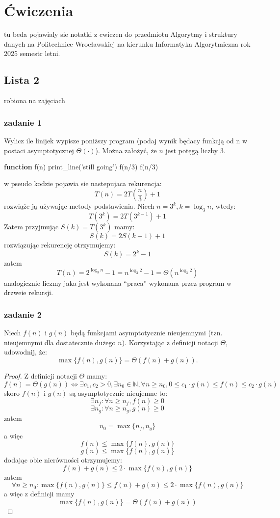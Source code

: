 \documentclass[11pt,a4paper]{article}
\begin{document}
\pagebreak
\section{Ćwiczenia}
tu beda pojawialy sie notatki z cwiczen do przedmiotu Algorytmy i struktury danych na Politechnice Wrocławskiej na kierunku Informatyka Algorytmiczna rok 2025 semestr letni.

\subsection{Lista 2}
robiona na zajęciach \date{2025-03-10}
\subsubsection{zadanie 1}
Wylicz ile linijek wypisze poniższy program (podaj wynik będacy funkcją od n w postaci asymptotycznej $\Theta(\cdot)$). Można założyć, że $n$ jest potęgą liczby $3$.
\begin{algorithm}
\begin{algorithmic}[1]
\State \textbf{function} f(n)
    \State print\_line('still going')
    \State f(n/3)
    \State f(n/3)
\EndIf
\end{algorithmic}
\end{algorithm}
w pseudo kodzie pojawia sie nastepujaca rekurencja:
\[
    T(n) = 2T(\frac{n}{3}) + 1
\]
rozwiąże ją używając metody podstawienia. Niech $n=3^k, k = \log_3 n$, wtedy:
\[
    T(3^k) = 2T(3^{k-1}) + 1
\]
Zatem przyjmując $S(k) = T(3^k)$ mamy:
\[
    S(k) = 2S(k-1) + 1
\]
rozwiązując rekurencję otrzymujemy:
\[
    S(k) = 2^k - 1
\]
zatem
\[
    T(n) = 2^{\log_3 n} - 1 = n^{\log_3 2} - 1 = \Theta(n^{\log_3 2})
\]
analogicznie liczmy jaka jest wykonana ``praca'' wykonana przez program w drzweie rekursji.

\subsubsection{zadanie 2}
Niech $f(n)$ i $g(n)$ będą funkcjami asymptotycznie nieujemnymi (tzn. nieujemnymi dla dostatecznie dużego $n$). Korzystając z definicji notacji $\Theta$, udowodnij, że:
\[
\max\{f(n), g(n)\} = \Theta(f(n) + g(n)).
\]
\begin{proof}
    Z definicji notacji $\Theta$ mamy:
    \[
        f(n)=\Theta(g(n)) \iff \exists c_1, c_2 > 0, \exists n_0 \in \mathbb{N}, \forall n \geq n_0, 0 \leq c_1 \cdot g(n) \leq f(n) \leq c_2 \cdot g(n)
    \]
    skoro $f(n)$ i $g(n)$ są asymptotycznie nieujemne to:
    \[
        \exists n_f: \forall n \geq n_f, f(n) \geq 0
    \]
    \[
        \exists n_g: \forall n \geq n_g, g(n) \geq 0
    \]
    zatem
    \[
        n_0=\max\{n_f, n_g\}
    \]
    a więc
    \[
        f(n) \leq \max\{f(n), g(n)\}
    \]
    \[
        g(n) \leq \max\{f(n), g(n)\}
    \]
    dodając obie nierówności otrzymujemy:
    \[
        f(n) + g(n) \leq 2 \cdot \max\{f(n), g(n)\}
    \]
    zatem
    \[
        \forall n \geq n_0: \max\{f(n), g(n)\} \leq f(n) + g(n) \leq 2 \cdot \max\{f(n), g(n)\}
    \]
    a więc z definicji mamy
    \[
        \max\{f(n), g(n)\} = \Theta(f(n) + g(n))
    \]
\end{proof}
\end{document}
